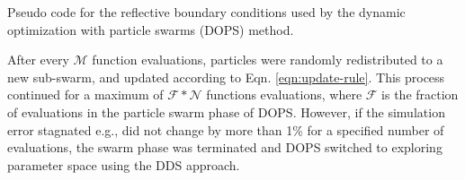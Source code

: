 \documentclass[12pt]{article}
\begin{document}
\begin{algorithm}
\caption{Pseudo code for the reflective boundary conditions used by the dynamic optimization with particle swarms (DOPS) method.}\label{algo_reflection}
\end{algorithm}

After every $\mathcal{M}$ function evaluations, particles were randomly redistributed to a new sub-swarm, and updated according to Eqn. \eqref{eqn:update-rule}.
This process continued for a maximum of $\mathcal{F}*\mathcal{N}$ functions evaluations, where $\mathcal{F}$ is the fraction of evaluations in the particle swarm phase of DOPS.
However, if the simulation error stagnated e.g., did not change by more than 1\% for a specified number of evaluations, the swarm phase was terminated and DOPS switched to
exploring parameter space using the DDS approach.
\end{document}

